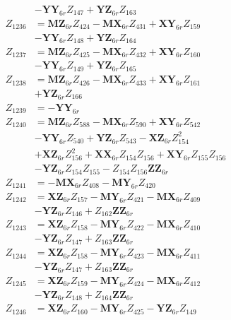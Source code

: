 \begin{multicols}{2}
\begin{align}
&- \mathbf{YY}_{6r}Z_{147} + \mathbf{YZ}_{6r}Z_{163} \nonumber \\
Z_{1236} &= \mathbf{MZ}_{6r}Z_{424} - \mathbf{MX}_{6r}Z_{431} + \mathbf{XY}_{6r}Z_{159}  \nonumber \\
&- \mathbf{YY}_{6r}Z_{148} + \mathbf{YZ}_{6r}Z_{164} \nonumber \\
Z_{1237} &= \mathbf{MZ}_{6r}Z_{425} - \mathbf{MX}_{6r}Z_{432} + \mathbf{XY}_{6r}Z_{160}  \nonumber \\
&- \mathbf{YY}_{6r}Z_{149} + \mathbf{YZ}_{6r}Z_{165} \nonumber \\
Z_{1238} &= \mathbf{MZ}_{6r}Z_{426} - \mathbf{MX}_{6r}Z_{433} + \mathbf{XY}_{6r}Z_{161}  \nonumber \\
&+ \mathbf{YZ}_{6r}Z_{166} \nonumber \\
Z_{1239} &= -\mathbf{YY}_{6r} \nonumber \\
Z_{1240} &= \mathbf{MZ}_{6r}Z_{588} - \mathbf{MX}_{6r}Z_{590} + \mathbf{XY}_{6r}Z_{542}  \nonumber \\
&- \mathbf{YY}_{6r}Z_{540} + \mathbf{YZ}_{6r}Z_{543} - \mathbf{XZ}_{6r}Z_{154}^2  \nonumber \\
&+ \mathbf{XZ}_{6r}Z_{156}^2 + \mathbf{XX}_{6r}Z_{154}Z_{156} + \mathbf{XY}_{6r}Z_{155}Z_{156}  \nonumber \\
&- \mathbf{YZ}_{6r}Z_{154}Z_{155} - Z_{154}Z_{156}\mathbf{ZZ}_{6r} \nonumber \\
Z_{1241} &= - \mathbf{MX}_{6r}Z_{408} - \mathbf{MY}_{6r}Z_{420} \nonumber \\
Z_{1242} &= \mathbf{XZ}_{6r}Z_{157} - \mathbf{MY}_{6r}Z_{421} - \mathbf{MX}_{6r}Z_{409}  \nonumber \\
&- \mathbf{YZ}_{6r}Z_{146} + Z_{162}\mathbf{ZZ}_{6r} \nonumber \\
Z_{1243} &= \mathbf{XZ}_{6r}Z_{158} - \mathbf{MY}_{6r}Z_{422} - \mathbf{MX}_{6r}Z_{410}  \nonumber \\
&- \mathbf{YZ}_{6r}Z_{147} + Z_{163}\mathbf{ZZ}_{6r} \nonumber \\
Z_{1244} &= \mathbf{XZ}_{6r}Z_{158} - \mathbf{MY}_{6r}Z_{423} - \mathbf{MX}_{6r}Z_{411}  \nonumber \\
&- \mathbf{YZ}_{6r}Z_{147} + Z_{163}\mathbf{ZZ}_{6r} \nonumber \\
Z_{1245} &= \mathbf{XZ}_{6r}Z_{159} - \mathbf{MY}_{6r}Z_{424} - \mathbf{MX}_{6r}Z_{412}  \nonumber \\
&- \mathbf{YZ}_{6r}Z_{148} + Z_{164}\mathbf{ZZ}_{6r} \nonumber \\
Z_{1246} &= \mathbf{XZ}_{6r}Z_{160} - \mathbf{MY}_{6r}Z_{425} - \mathbf{YZ}_{6r}Z_{149}  \nonumber \\

\end{align}
\end{multicols}

